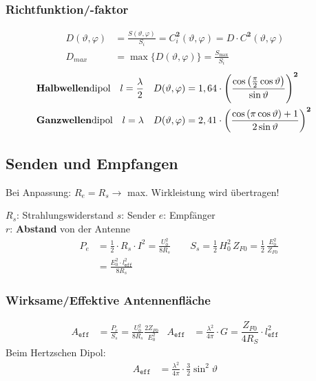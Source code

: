 \subsubsection{Richtfunktion/-faktor}
\begin{align*}
    D(\vartheta, \varphi) & = \frac{S(\vartheta, \varphi)}{S_{i}} = C^\mathbf{2}_i(\vartheta, \varphi) = D \cdot C^\mathbf{2}(\vartheta, \varphi) &\\
    D_{max} & = \max \{D(\vartheta, \varphi)\} = \frac{S_{\max}}{S_{i}}&
\end{align*}
\vspace{-0.5cm}
\begin{align*}
	&\text{\textbf{Halbwellen}dipol}\quad l=\frac{\lambda}{2} &D(\vartheta, \varphi) &= 1,64 \cdot  
	\left(\frac{\cos\left(\frac{\pi}{2}\cos\vartheta\right)}{\sin\vartheta}\right)^\mathbf{2}&\\
	&\text{\textbf{Ganzwellen}dipol}\quad l=\lambda &D(\vartheta, \varphi) &= 2,41 \cdot
	\left(\frac{\cos\left(\pi\cos\vartheta\right)+1}{2\sin\vartheta}\right)^\mathbf{2}&
\end{align*}

\subsection{Senden und Empfangen}
Bei Anpassung: $R_e = R_s \rightarrow$ max. Wirkleistung wird übertragen!


$ R_s $: Strahlungswiderstand \quad $ s $: Sender \qquad $ e $: Empfänger\\
$ r $: \textbf{Abstand} von der Antenne
\begin{align*}
	P_e &= \frac{1}{2}\cdot R_s \cdot I^2 = \frac{U_0^2}{8R_{s}} \qquad S_s = \frac{1}{2}\, H_0^2 \, Z_{F0} = \frac{1}{2} \, \frac{E_0^2}{Z_{F0}}  \\
	&= \frac{E_0^2\cdot l^2_{\mathtt{eff}}}{8R_{s}}
\end{align*}
\subsubsection{Wirksame/Effektive Antennenfläche}
\begin{align*}
	A_\texttt{eff} & = \frac{P_e}{S_s} = \frac{U_0^2}{8R_{s}}\frac{2Z_{F0}}{E_0^2} &
	A_\texttt{eff} & = \frac{\lambda^2}{4\pi}\cdot G = \dfrac{Z_{F0}}{4 R_S} \cdot l_\texttt{eff}^2&
\end{align*}
Beim Hertzschen Dipol:
\begin{align*}
	A_\texttt{eff} & =  \frac{\lambda^2}{4\pi}\cdot\frac{3}{2}\sin^2\vartheta &
\end{align*}
